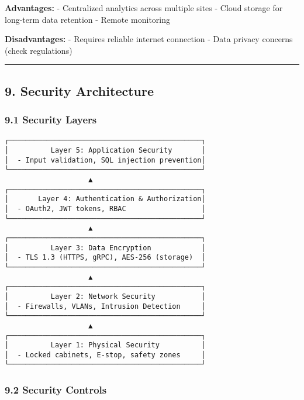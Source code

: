 \documentclass[
]{article}
\begin{document}
\textbf{Advantages:} - Centralized analytics across multiple sites -
Cloud storage for long-term data retention - Remote monitoring

\textbf{Disadvantages:} - Requires reliable internet connection - Data
privacy concerns (check regulations)

\begin{center}\rule{0.5\linewidth}{0.5pt}\end{center}

\hypertarget{security-architecture}{%
\subsection{9. Security Architecture}\label{security-architecture}}

\hypertarget{security-layers}{%
\subsubsection{9.1 Security Layers}\label{security-layers}}

\begin{verbatim}
┌──────────────────────────────────────────────┐
│          Layer 5: Application Security       │
│  - Input validation, SQL injection prevention│
└──────────────────────────────────────────────┘
                    ▲
┌──────────────────────────────────────────────┐
│       Layer 4: Authentication & Authorization│
│  - OAuth2, JWT tokens, RBAC                  │
└──────────────────────────────────────────────┘
                    ▲
┌──────────────────────────────────────────────┐
│          Layer 3: Data Encryption            │
│  - TLS 1.3 (HTTPS, gRPC), AES-256 (storage)  │
└──────────────────────────────────────────────┘
                    ▲
┌──────────────────────────────────────────────┐
│          Layer 2: Network Security           │
│  - Firewalls, VLANs, Intrusion Detection     │
└──────────────────────────────────────────────┘
                    ▲
┌──────────────────────────────────────────────┐
│          Layer 1: Physical Security          │
│  - Locked cabinets, E-stop, safety zones     │
└──────────────────────────────────────────────┘
\end{verbatim}

\hypertarget{security-controls}{%
\subsubsection{9.2 Security Controls}\label{security-controls}}
\end{document}
